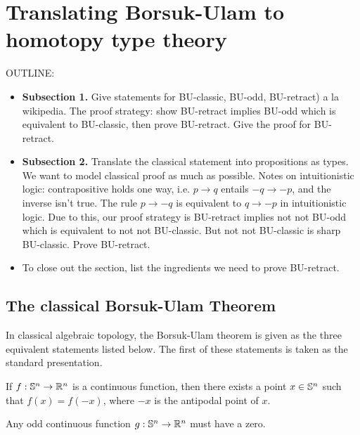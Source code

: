 \documentclass{amsart}
\begin{document}
\section{Translating Borsuk-Ulam to homotopy type theory}
\label{sec:bu-to-hott}

OUTLINE:
\begin{itemize}
\item
  \textbf{Subsection 1.} Give statements for BU-classic,
  BU-odd, BU-retract) a la wikipedia. The proof strategy:
  show BU-retract implies BU-odd which is equivalent to
  BU-classic, then prove BU-retract. Give the proof for
  BU-retract.
\item \textbf{Subsection 2.} Translate the classical statement into
  propositions as types. We want to model classical proof as much as
  possible.  Notes on intuitionistic logic: contrapositive holds one
  way, i.e. $p \to q$ entails $-q \to -p$, and the inverse isn't true.
  The rule $p \to -q$ is equivalent to $q \to -p$ in intuitionistic
  logic. Due to this, our proof strategy is BU-retract implies not not
  BU-odd which is equivalent to not not BU-classic. But not not
  BU-classic is sharp BU-classic. Prove BU-retract.
\item
  To close out the section, list the ingredients we need to
  prove BU-retract.
\end{itemize}

\subsection{The classical Borsuk-Ulam Theorem}

In classical algebraic topology, the Borsuk-Ulam theorem is given
as the three equivalent statements listed below. The first of these
statements is taken as the standard presentation.

\begin{statement}\label{BUClassic}
  If $f: \mathbb{S}^n \rightarrow \mathbb{R}^n$ is a continuous function, then there
  exists a point $x \in \mathbb{S}^n$ such that $f(x) = f(-x)$, where $-x$ is
  the antipodal point of $x$.
\end{statement}

\begin{statement}\label{BUOdd}
  Any odd continuous function $g: \mathbb{S}^n \rightarrow \mathbb{R}^n$ must have a
  zero.
\end{statement}
\end{document}
